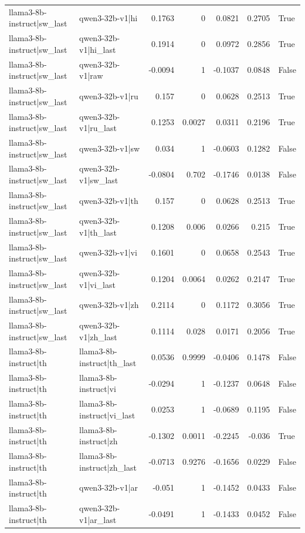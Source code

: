 \begin{table}
\begin{tabular}{l l r r r r l}
llama3-8b-instruct|sw_last & qwen3-32b-v1|hi & 0.1763 & 0 & 0.0821 & 0.2705 & True \\
llama3-8b-instruct|sw_last & qwen3-32b-v1|hi_last & 0.1914 & 0 & 0.0972 & 0.2856 & True \\
llama3-8b-instruct|sw_last & qwen3-32b-v1|raw & -0.0094 & 1 & -0.1037 & 0.0848 & False \\
llama3-8b-instruct|sw_last & qwen3-32b-v1|ru & 0.157 & 0 & 0.0628 & 0.2513 & True \\
llama3-8b-instruct|sw_last & qwen3-32b-v1|ru_last & 0.1253 & 0.0027 & 0.0311 & 0.2196 & True \\
llama3-8b-instruct|sw_last & qwen3-32b-v1|sw & 0.034 & 1 & -0.0603 & 0.1282 & False \\
llama3-8b-instruct|sw_last & qwen3-32b-v1|sw_last & -0.0804 & 0.702 & -0.1746 & 0.0138 & False \\
llama3-8b-instruct|sw_last & qwen3-32b-v1|th & 0.157 & 0 & 0.0628 & 0.2513 & True \\
llama3-8b-instruct|sw_last & qwen3-32b-v1|th_last & 0.1208 & 0.006 & 0.0266 & 0.215 & True \\
llama3-8b-instruct|sw_last & qwen3-32b-v1|vi & 0.1601 & 0 & 0.0658 & 0.2543 & True \\
llama3-8b-instruct|sw_last & qwen3-32b-v1|vi_last & 0.1204 & 0.0064 & 0.0262 & 0.2147 & True \\
llama3-8b-instruct|sw_last & qwen3-32b-v1|zh & 0.2114 & 0 & 0.1172 & 0.3056 & True \\
llama3-8b-instruct|sw_last & qwen3-32b-v1|zh_last & 0.1114 & 0.028 & 0.0171 & 0.2056 & True \\
llama3-8b-instruct|th & llama3-8b-instruct|th_last & 0.0536 & 0.9999 & -0.0406 & 0.1478 & False \\
llama3-8b-instruct|th & llama3-8b-instruct|vi & -0.0294 & 1 & -0.1237 & 0.0648 & False \\
llama3-8b-instruct|th & llama3-8b-instruct|vi_last & 0.0253 & 1 & -0.0689 & 0.1195 & False \\
llama3-8b-instruct|th & llama3-8b-instruct|zh & -0.1302 & 0.0011 & -0.2245 & -0.036 & True \\
llama3-8b-instruct|th & llama3-8b-instruct|zh_last & -0.0713 & 0.9276 & -0.1656 & 0.0229 & False \\
llama3-8b-instruct|th & qwen3-32b-v1|ar & -0.051 & 1 & -0.1452 & 0.0433 & False \\
llama3-8b-instruct|th & qwen3-32b-v1|ar_last & -0.0491 & 1 & -0.1433 & 0.0452 & False \\

\end{tabular}
\end{table}
